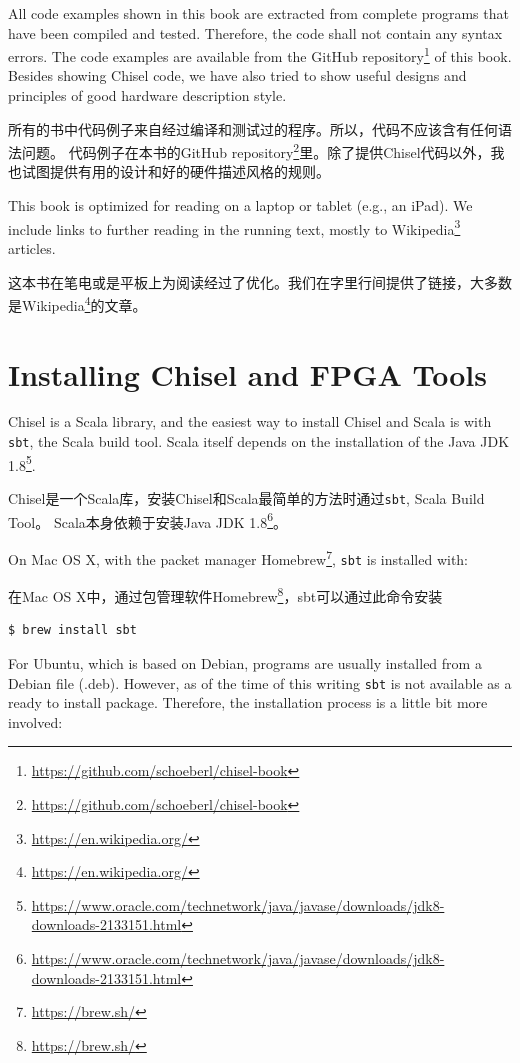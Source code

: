 \documentclass[%
    10pt,
    headinclude, footexclude,
    openright, %
    notitlepage,
    cleardoubleempty,
    headsepline,
    pointlessnumbers,
    bibtotoc, idxtotoc,
    ]{scrbook}
\newcommand{\code}[1]{{\small{\texttt{#1}}}}
\newcommand{\myref}[2]{\href{#1}{#2}}
\renewcommand{\myref}[2]{{#2}{\footnote{\url{#1}}}}
\begin{document}
All code examples shown in this book are extracted from complete programs
that have been compiled and tested. Therefore, the code shall not contain
any syntax errors. The code examples are available from the
\myref{https://github.com/schoeberl/chisel-book}{GitHub repository}
of this book.
Besides showing Chisel code, we have also tried to show useful designs and
principles of good hardware description style.

所有的书中代码例子来自经过编译和测试过的程序。所以，代码不应该含有任何语法问题。
代码例子在本书的\myref{https://github.com/schoeberl/chisel-book}{GitHub repository}里。除了提供Chisel代码以外，我也试图提供有用的设计和好的硬件描述风格的规则。


This book is optimized for reading on a laptop or tablet (e.g., an iPad).
We include links to further reading in the running text, mostly to
\myref{https://en.wikipedia.org/}{Wikipedia} articles.

这本书在笔电或是平板上为阅读经过了优化。我们在字里行间提供了链接，大多数是\myref{https://en.wikipedia.org/}{Wikipedia}的文章。

\section{Installing Chisel and FPGA Tools}

Chisel is a Scala library, and the easiest way to install Chisel and Scala is
with \code{sbt}, the Scala build tool. Scala itself depends on the installation
of the \myref{https://www.oracle.com/technetwork/java/javase/downloads/jdk8-downloads-2133151.html}{Java JDK 1.8}.

Chisel是一个Scala库，安装Chisel和Scala最简单的方法时通过\code{sbt}, Scala Build Tool。
Scala本身依赖于安装\myref{https://www.oracle.com/technetwork/java/javase/downloads/jdk8-downloads-2133151.html}{Java JDK 1.8}。

On Mac OS X, with the packet manager \myref{https://brew.sh/}{Homebrew},
\code{sbt} is installed with:

在Mac OS X中，通过包管理软件\myref{https://brew.sh/}{Homebrew}，sbt可以通过此命令安装

\begin{verbatim}
$ brew install sbt
\end{verbatim}

\noindent For Ubuntu, which is based on Debian, programs are usually installed from a
Debian file (.deb). However, as of the time of this writing \code{sbt} is not
available as a ready to install package. Therefore, the installation process
is a little bit more involved:
\end{document}
